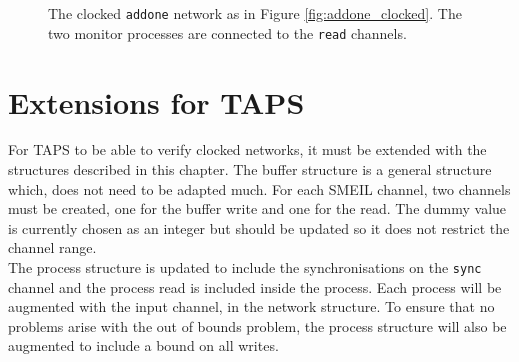 \begin{figure}
\centering
{}
\caption{The clocked \texttt{addone} network as in Figure \ref{fig:addone_clocked}. The two monitor processes are connected to the \texttt{read} channels.}
\label{fig:addone_clocked_monitor}
\end{figure}


\section{Extensions for TAPS}
For TAPS to be able to verify clocked networks, it must be extended with the structures described in this chapter. The buffer structure is a general structure which, does not need to be adapted much. For each SMEIL channel, two \cspm{} channels must be created, one for the buffer write and one for the read. The dummy value is currently chosen as an integer but should be updated so it does not restrict the channel range. \\

The process structure is updated to include the synchronisations on the \texttt{sync} channel and the process read is included inside the process. Each process will be augmented with the input channel, in the network structure.
To ensure that no problems arise with the out of bounds problem, the process structure will also be augmented to include a \cspm{} bound on all writes. \\


